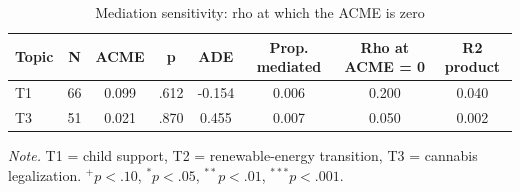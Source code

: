 \begin{table}[htbp]
\centering
\begin{threeparttable}
\caption{Mediation sensitivity: rho at which the ACME is zero}
\label{tab:tab_h3b_sensitivity}
\begin{tabular}{lccccccc}
\toprule
  Topic & N & ACME & p & ADE & Prop. mediated & Rho at ACME = 0 & R2 product \\
\midrule
  T1 & 66 & 0.099 & .612 & -0.154 & 0.006 & 0.200 & 0.040 \\
  T3 & 51 & 0.021 & .870 & 0.455 & 0.007 & 0.050 & 0.002 \\
\bottomrule
\end{tabular}
\begin{tablenotes}\footnotesize\item \textit{Note.} T1 = child support, T2 = renewable-energy transition, T3 = cannabis legalization. $^{+}p<.10$, $^{*}p<.05$, $^{**}p<.01$, $^{***}p<.001$.\end{tablenotes}
\end{threeparttable}
\end{table}
